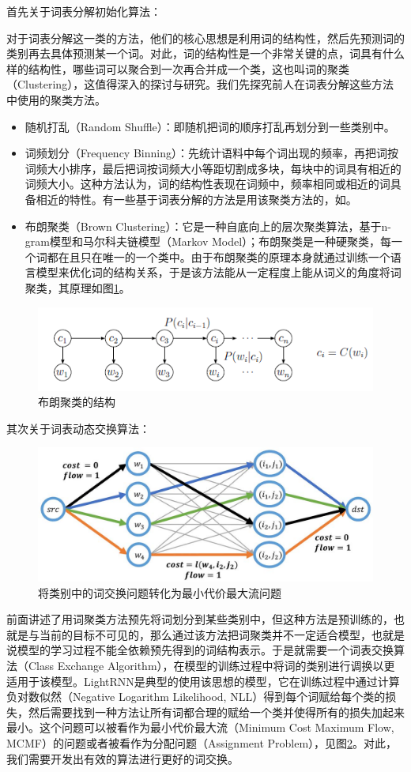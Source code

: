 \documentclass[12pt,a4paper]{article}
\begin{document}
首先关于词表分解初始化算法：

对于词表分解这一类的方法，他们的核心思想是利用词的结构性，然后先预测词的类别再去具体预测某一个词。对此，词的结构性是一个非常关键的点，词具有什么样的结构性，哪些词可以聚合到一次再合并成一个类，这也叫词的聚类（Clustering），这值得深入的探讨与研究。我们先探究前人在词表分解这些方法中使用的聚类方法。
\begin{itemize}
  \item 随机打乱（Random Shuffle）：即随机把词的顺序打乱再划分到一些类别中。
  \item 词频划分（Frequency Binning）：先统计语料中每个词出现的频率，再把词按词频大小排序，最后把词按词频大小等距切割成多块，每块中的词具有相近的词频大小。这种方法认为，词的结构性表现在词频中，频率相同或相近的词具备相近的特性。有一些基于词表分解的方法是用该聚类方法的，如\cite{DBLP:conf/nips/MikolovSCCD13,DBLP:conf/acl/ChenGA16}。
  \item 布朗聚类（Brown Clustering）：它是一种自底向上的层次聚类算法，基于n-gram模型和马尔科夫链模型（Markov Model）；布朗聚类是一种硬聚类，每一个词都在且只在唯一的一个类中。由于布朗聚类的原理本身就通过训练一个语言模型来优化词的结构关系，于是该方法能从一定程度上能从词义的角度将词聚类，其原理如图\ref{fig:brown_cluster}。
\end{itemize}
\begin{figure}[!ht]
  \centering
  \includegraphics[width=0.65\columnwidth]{./figures/brown_clustering.png}
  \caption{布朗聚类的结构}
  \label{fig:brown_cluster}
\end{figure}

其次关于词表动态交换算法：
\begin{figure}
  \centering
  \includegraphics[width=0.65\columnwidth]{./figures/mcmf.jpg}
  \caption{将类别中的词交换问题转化为最小代价最大流问题}
  \label{fig:mcmf}
\end{figure}
前面讲述了用词聚类方法预先将词划分到某些类别中，但这种方法是预训练的，也就是与当前的目标不可见的，那么通过该方法把词聚类并不一定适合模型，也就是说模型的学习过程不能全依赖预先得到的词结构表示。于是就需要一个词表交换算法（Class Exchange Algorithm），在模型的训练过程中将词的类别进行调换以更适用于该模型。LightRNN是典型的使用该思想的模型，它在训练过程中通过计算负对数似然（Negative Logarithm Likelihood, NLL）得到每个词赋给每个类的损失，然后需要找到一种方法让所有词都合理的赋给一个类并使得所有的损失加起来最小。这个问题可以被看作为最小代价最大流（Minimum Cost Maximum Flow, MCMF）的问题或者被看作为分配问题（Assignment Problem），见图\ref{fig:mcmf}。对此，我们需要开发出有效的算法进行更好的词交换。
\end{document}
